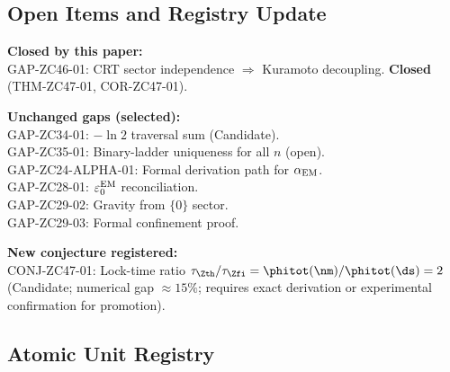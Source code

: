 \documentclass[12pt, a4paper]{article}
\begin{document}
\subsection{Open Items and Registry Update}
\label{sec:open}


\begin{openqbox}[title={Gaps and Conjectures After ZC47}]
\textbf{Closed by this paper:}\\
GAP-ZC46-01: CRT sector independence $\Rightarrow$ Kuramoto
decoupling. \textbf{Closed} (THM-ZC47-01, COR-ZC47-01).

\medskip
\textbf{Unchanged gaps (selected):}\\
GAP-ZC34-01: $-\ln 2$ traversal sum (Candidate).\\
GAP-ZC35-01: Binary-ladder uniqueness for all $n$ (open).\\
GAP-ZC24-ALPHA-01: Formal derivation path for $\alpha_{\rm EM}$.\\
GAP-ZC28-01: $\varepsilon_0^{\rm EM}$ reconciliation.\\
GAP-ZC29-02: Gravity from $\{0\}$ sector.\\
GAP-ZC29-03: Formal confinement proof.

\medskip
\textbf{New conjecture registered:}\\
CONJ-ZC47-01: Lock-time ratio $\tau_{\Zth}/\tau_{\Zfi}
= \phitot(\nm)/\phitot(\ds) = 2$ (Candidate;
numerical gap $\approx 15\%$; requires exact derivation
or experimental confirmation for promotion).
\end{openqbox}

\subsection{Atomic Unit Registry}
\label{sec:registry}

\end{document}
